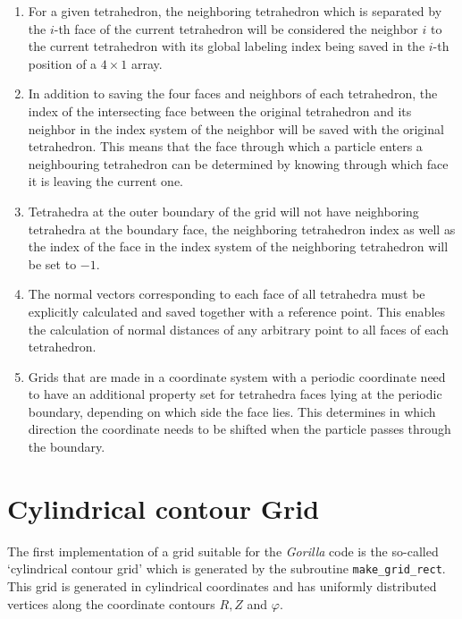 \documentclass[./main.tex]{subfiles}
\begin{document}
\begin{enumerate}
	\item For a given tetrahedron, the neighboring tetrahedron which is separated by the $i$-th face of the current tetrahedron will be considered the neighbor $i$ to the current tetrahedron with its global labeling index being saved in the $i$-th position of a $4\times1$ array.
	
	\item In addition to saving the four faces and neighbors of each tetrahedron, the index of the intersecting face between the original tetrahedron and its neighbor in the index system of the neighbor will be saved with the original tetrahedron. This means that the face through which a particle enters a neighbouring tetrahedron can be determined by knowing through which face it is leaving the current one.
	
	\item Tetrahedra at the outer boundary of the grid will not have neighboring tetrahedra at the boundary face, the neighboring tetrahedron index as well as the index of the face in the index system of the neighboring tetrahedron will be set to $-1$.
	
	\item The normal vectors corresponding to each face of all tetrahedra must be explicitly calculated and saved together with a reference point. This enables the calculation of normal distances of any arbitrary point to all faces of each tetrahedron.
	
	\item Grids that are made in a coordinate system with a periodic coordinate need to have an additional property set for tetrahedra faces lying at the periodic boundary, depending on which side the face lies. This determines in which direction the coordinate needs to be shifted when the particle passes through the boundary. 
\end{enumerate}

\section{Cylindrical contour Grid}
The first implementation of a grid suitable for the \textit{Gorilla} code is the so-called \enquote*{cylindrical contour grid} which is generated by the subroutine \texttt{make\_grid\_rect}. This grid is generated in cylindrical coordinates and has uniformly distributed vertices along the coordinate contours $R, Z$ and $\varphi$. 
\end{document}
